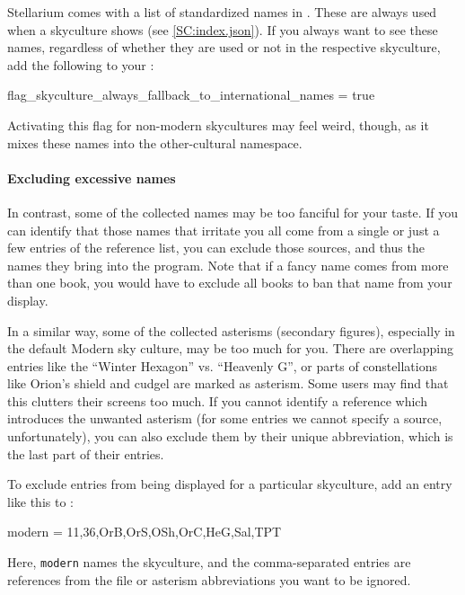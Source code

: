 Stellarium comes with a list of standardized names in . 
These are always used when a skyculture shows  (see \ref{SC:index.json}).
If you always want to see these names, regardless of whether they are used or not in the respective skyculture, add the following to your :
\begin{configfile}
[viewing]
flag_skyculture_always_fallback_to_international_names = true
\end{configfile}
Activating this flag for non-modern skycultures may feel weird, though, as it mixes these names into the other-cultural namespace.

\paragraph{Excluding excessive names}
\label{sec:skycultures:exclude_references}
In contrast, some of the collected names may be too fanciful for your taste. 
If you can identify that those names that irritate you all come from a single or just a few entries of the reference list, 
you can exclude those sources, and thus the names they bring into the program. Note that if a fancy name comes from more than one book, 
you would have to exclude all books to ban that name from your display.

In a similar way, some of the collected asterisms (secondary figures), especially in the default Modern sky culture, may be too much for you. 
There are overlapping entries like the ``Winter Hexagon'' vs. ``Heavenly G'', 
or parts of constellations like Orion's shield and cudgel are marked as asterism. Some users may find that this clutters their screens too much. 
If you cannot identify a reference which introduces the unwanted asterism (for some entries we cannot specify a source, unfortunately), 
you can also exclude them by their unique abbreviation, which is the last part of their  entries.

To exclude entries from being displayed for a particular skyculture, add an entry like this to :
\begin{configfile}
[SCExcludeReferences]
modern  = 11,36,OrB,OrS,OSh,OrC,HeG,Sal,TPT
\end{configfile}
%
Here, \texttt{modern} names the skyculture, and the comma-separated entries are references from the file  or 
asterism abbreviations you want to be ignored.



